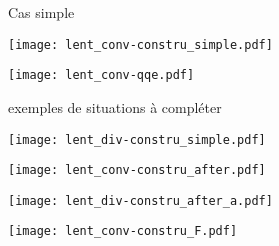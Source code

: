 \documentclass[../main/main.tex]{subfiles}
\begin{document}
\begin{exem}[label=exem, sidebyside]{Cas simple}
    \begin{center}
        \texttt{[image: lent\_conv-constru\_simple.pdf]}
        \label{fig:corrconvconstrusimple}
    \end{center}
    \tcblower
    \begin{center}
        \texttt{[image: lent\_conv-qqe.pdf]}
        \label{fig:convconstruqqe}
    \end{center}
\end{exem}
\begin{impo}[label=impo:cons_exem]{exemples de situations à compléter}
    \begin{minipage}{0.50\linewidth}
        \begin{center}
            \texttt{[image: lent\_div-constru\_simple.pdf]}
            \label{fig:corrdivconstrusimple}
        \end{center}
    \end{minipage}
    \hfill
    \begin{minipage}{0.50\linewidth}
        \begin{center}
            \texttt{[image: lent\_conv-constru\_after.pdf]}
            \label{fig:corrconvconstruafter}
        \end{center}
    \end{minipage}
    \begin{minipage}{0.50\linewidth}
        \begin{center}
            \texttt{[image: lent\_div-constru\_after\_a.pdf]}
            \label{fig:corrdivconstruafter}
        \end{center}
    \end{minipage}
    \hfill
    \begin{minipage}{0.50\linewidth}
        \begin{center}
            \texttt{[image: lent\_conv-constru\_F.pdf]}
            \label{fig:corrconvconstruF}
        \end{center}
    \end{minipage}
\end{impo}
\end{document}
